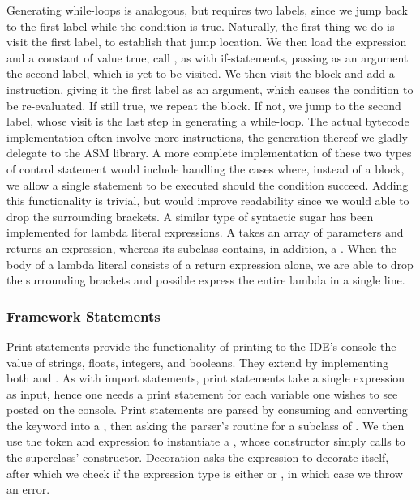 Generating while-loops is analogous, but requires two labels, since we jump back to the first label while the condition is true. Naturally, the first thing we do is visit the first label, to establish that jump location. We then load the expression and a constant of value true, call , as with if-statements, passing as an argument the second label, which is yet to be visited. We then visit the block and add a  instruction, giving it the first label as an argument, which causes the condition to be re-evaluated. If still true, we repeat the block. If not, we jump to the second label, whose visit is the last step in generating a while-loop. The actual bytecode implementation often involve more instructions, the generation thereof we gladly delegate to the ASM library. A more complete implementation of these two types of control statement would include handling the cases where, instead of a block, we allow a single statement to be executed should the condition succeed. Adding this functionality is trivial, but would improve readability since we would able to drop the surrounding brackets. A similar type of syntactic sugar has been implemented for lambda literal expressions. A  takes an array of parameters and returns an expression, whereas its subclass  contains, in addition, a . When the body of a lambda literal consists of a return expression alone, we are able to drop the surrounding brackets and possible express the entire lambda in a single line.

\subsubsection{Framework Statements}

Print statements provide the functionality of printing to the IDE's console the value of strings, floats, integers, and booleans. They extend  by implementing both  and . As with import statements, print statements take a single expression as input, hence one needs a print statement for each variable one wishes to see posted on the console. Print statements are parsed by consuming and converting the  keyword into a , then asking the parser's  routine for a subclass of . We then use the token and expression to instantiate a , whose constructor simply calls to the superclass' constructor. Decoration asks the expression to decorate itself, after which we check if the expression type is either  or , in which case we throw an error.

